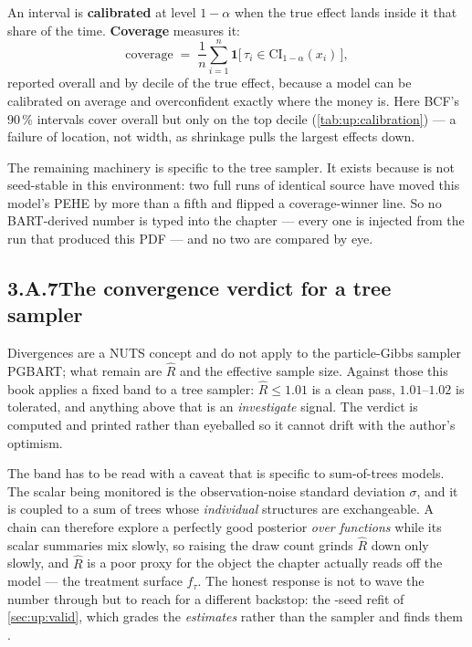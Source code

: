 An interval is \textbf{calibrated} at level $1 - \alpha$ when the true effect lands inside it that
share of the time. \textbf{Coverage} measures it:
%
\begin{equation}
  \text{coverage}
  \;=\; \frac1n \sum_{i=1}^{n} \mathbf 1\big[\,\tau_i \in \text{CI}_{1-\alpha}(x_i)\,\big],
  \label{eq:up:appcov}
\end{equation}
%
reported overall and by decile of the true effect, because a model can be calibrated on average and
overconfident exactly where the money is. Here BCF's 90\,\% intervals cover \pc{\nbOneBcfCovNinety}
overall but only \pc{\nbOneBcfTopDec} on the top decile (\cref{tab:up:calibration}) --- a failure of
location, not width, as shrinkage pulls the largest effects down.

The remaining machinery is specific to the tree sampler. It exists because  is not
seed-stable in this environment: two full runs of identical source have moved this model's PEHE by more
than a fifth and flipped a coverage-winner line. So no BART-derived number is typed into the chapter
--- every one is injected from the run that produced this PDF --- and no two are compared by eye.

\subsection*{3.A.7\quad The convergence verdict for a tree sampler}

Divergences are a NUTS concept and do not apply to the particle-Gibbs sampler PGBART; what remain
are $\hat R$ and the effective sample size. Against those this book applies a fixed band to a tree
sampler: $\hat R \le 1.01$ is a clean pass, $1.01$--$1.02$ is tolerated, and anything above that is
an \emph{investigate} signal. The verdict is computed and printed rather than eyeballed so it cannot
drift with the author's optimism.

The band has to be read with a caveat that is specific to sum-of-trees models. The scalar being
monitored is the observation-noise standard deviation $\sigma$, and it is coupled to a sum of
\nbOneBcfTrees{} trees whose \emph{individual} structures are exchangeable. A chain can therefore
explore a perfectly good posterior \emph{over functions} while its scalar summaries mix slowly, so
raising the draw count grinds $\hat R$ down only slowly, and $\hat R$ is a poor proxy for the object
the chapter actually reads off the model --- the treatment surface $f_\tau$. The honest response is
not to wave the number through but to reach for a different backstop: the \nbOneNSeeds-seed refit of
\cref{sec:up:valid}, which grades the \emph{estimates} rather than the sampler and finds them
\nbOneStabVerdict.

